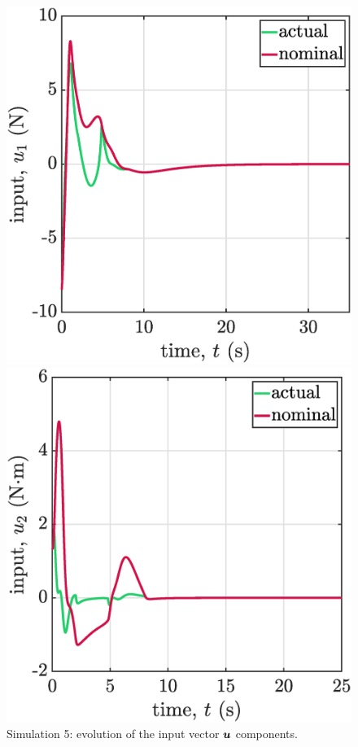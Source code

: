 \begin{figure}[!ht]
    \begin{minipage}[t]{.45\textwidth}
        \centering
        \includegraphics[width=\textwidth]{figures/sim5u1.eps}
    \end{minipage}
    \hfill
    \begin{minipage}[t]{.45\textwidth}
        \centering
        \includegraphics[width=\textwidth]{figures/sim5u2.eps}
    \end{minipage}
    \caption{\label{fig:sim5u2}Simulation 5: evolution of the input vector $\boldsymbol{u}$ components.}
    

\end{figure}
